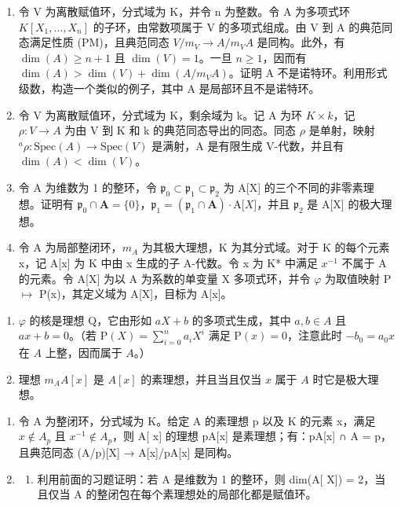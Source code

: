 
\begin{enumerate}
\def\labelenumi{\arabic{enumi})}
\item
  令 V 为离散赋值环，分式域为 K，并令 n 为整数。令 A 为多项式环 \(K[X_{1},...,X_{n}]\) 的子环，由常数项属于 V 的多项式组成。由 V 到 A 的典范同态满足性质 (PM)，且典范同态 \(V/m_{V} \rightarrow A/m_{V}A\) 是同构。此外，有 \(\dim(A) \geqslant n + 1\) 且 \(\dim(V) = 1\)。一旦 \(n \geqslant 1\)，因而有 \(\dim(A) > \dim(V) + \dim(A/m_{V}A)\)。证明 A 不是诺特环。利用形式级数，构造一个类似的例子，其中 A 是局部环且不是诺特环。
\item
  令 V 为离散赋值环，分式域为 K，剩余域为 k。记 A 为环 \(K \times k\)，记 \(\rho : V \to A\) 为由 V 到 K 和 k 的典范同态导出的同态。同态 \(\rho\) 是单射，映射 \(^{a}\rho : \text{Spec}(A) \to \text{Spec}(V)\) 是满射，A 是有限生成 V-代数，并且有 \(\dim(A) < \dim(V)\)。
\item
  令 A 为维数为 1 的整环，令 \(\mathfrak{p}_0 \subset \mathfrak{p}_1 \subset \mathfrak{p}_2\) 为 A{[}X{]} 的三个不同的非零素理想。证明有 \(\mathfrak{p}_0 \cap \mathbf{A} = \{0\}\)，\(\mathfrak{p}_1 = (\mathfrak{p}_1 \cap \mathbf{A})\cdot\mathrm{A}{[}X{]}\)，并且 \(\mathfrak{p}_2\) 是 A{[}X{]} 的极大理想。
\item
  令 A 为局部整闭环，\(m_A\) 为其极大理想，K 为其分式域。对于 K 的每个元素 x，记 A{[}x{]} 为 K 中由 x 生成的子 A-代数。令 x 为 K* 中满足 \(x^{-1}\) 不属于 A 的元素。令 A{[}X{]} 为以 A 为系数的单变量 X 多项式环，并令 \(\varphi\) 为取值映射 P \(\mapsto\) P(x)，其定义域为 A{[}X{]}，目标为 A{[}x{]}。
\end{enumerate}

\begin{enumerate}
\def\labelenumi{\alph{enumi})}
\item
  \(\varphi\) 的核是理想 Q，它由形如 \(aX + b\) 的多项式生成，其中 \(a, b \in A\) 且 \(ax + b = 0\)。（若 \(\mathrm{P}(X) = \sum_{i=0}^{n} a_i X^i\) 满足 \(\mathrm{P}(x) = 0\)，注意此时 \(-b_0 = a_0 x\) 在 \(A\) 上整，因而属于 \(A\)。）
\item
  理想 \(m_A A[x]\) 是 \(A[x]\) 的素理想，并且当且仅当 \(x\) 属于 \(A\) 时它是极大理想。
\end{enumerate}

\begin{enumerate}
\def\labelenumi{\arabic{enumi})}
\setcounter{enumi}{4}
\item
  令 A 为整闭环，分式域为 K。给定 A 的素理想 p 以及 K 的元素 x，满足 \(x \notin A_{p}\) 且 \(x^{-1} \notin A_{p}\)，则 A{[} x{]} 的理想 pA{[}x{]} 是素理想；有：pA{[}x{]} ∩ A = p，且典范同态 (A/p){[}X{]} → A{[}x{]}/pA{[}x{]} 是同构。
\item
  \begin{enumerate}
  \def\labelenumii{\alph{enumii})}
  \tightlist
  \item
    利用前面的习题证明：若 A 是维数为 1 的整环，则 dim(A{[} X{]}) = 2，当且仅当 A 的整闭包在每个素理想处的局部化都是赋值环。
  \end{enumerate}
\end{enumerate}

